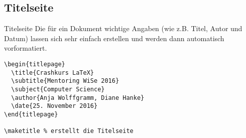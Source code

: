 \subsection{Titelseite}
\begin{frame}[fragile]{Titelseite}
Die für ein Dokument wichtige Angaben (wie z.B. Titel, Autor und Datum) lassen sich sehr einfach erstellen und werden dann automatisch vorformatiert.
\begin{lstlisting}[style=tex]
\begin{titlepage}
  \title{Crashkurs LaTeX}
  \subtitle{Mentoring WiSe 2016}
  \subject{Computer Science}
  \author{Anja Wolffgramm, Diane Hanke}
  \date{25. November 2016}
\end{titlepage}

\maketitle % erstellt die Titelseite
\end{lstlisting}


% 
% 

% 
  
% 
\end{frame}